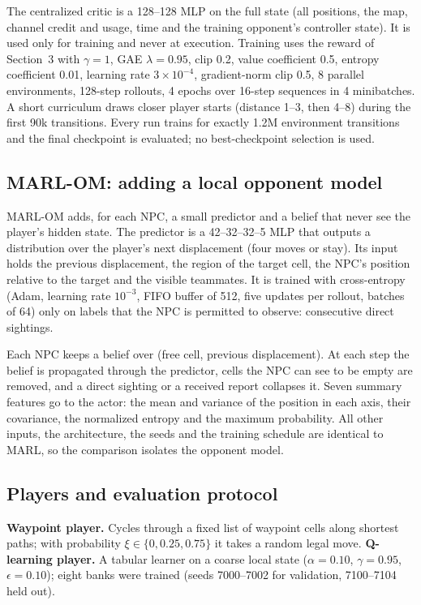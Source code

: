 \documentclass{article}
\begin{document}
The centralized critic is a 128--128 MLP on the full state (all positions, the map, channel credit and usage, time and the training opponent's controller state). It is used only for training and never at execution. Training uses the reward of Section~3 with $\gamma=1$, GAE $\lambda=0.95$, clip 0.2, value coefficient 0.5, entropy coefficient 0.01, learning rate $3\times10^{-4}$, gradient-norm clip 0.5, 8 parallel environments, 128-step rollouts, 4 epochs over 16-step sequences in 4 minibatches. A short curriculum draws closer player starts (distance 1--3, then 4--8) during the first 90k transitions. Every run trains for exactly 1.2M environment transitions and the final checkpoint is evaluated; no best-checkpoint selection is used.

\subsection{MARL-OM: adding a local opponent model}
MARL-OM adds, for each NPC, a small predictor and a belief that never see the player's hidden state. The predictor is a 42--32--32--5 MLP that outputs a distribution over the player's next displacement (four moves or stay). Its input holds the previous displacement, the region of the target cell, the NPC's position relative to the target and the visible teammates. It is trained with cross-entropy (Adam, learning rate $10^{-3}$, FIFO buffer of 512, five updates per rollout, batches of 64) only on labels that the NPC is permitted to observe: consecutive direct sightings.

Each NPC keeps a belief over (free cell, previous displacement). At each step the belief is propagated through the predictor, cells the NPC can see to be empty are removed, and a direct sighting or a received report collapses it. Seven summary features go to the actor: the mean and variance of the position in each axis, their covariance, the normalized entropy and the maximum probability. All other inputs, the architecture, the seeds and the training schedule are identical to MARL, so the comparison isolates the opponent model.

\subsection{Players and evaluation protocol}
\textbf{Waypoint player.} Cycles through a fixed list of waypoint cells along shortest paths; with probability $\xi\in\{0,0.25,0.75\}$ it takes a random legal move. \textbf{Q-learning player.} A tabular learner on a coarse local state ($\alpha=0.10$, $\gamma=0.95$, $\epsilon=0.10$); eight banks were trained (seeds 7000--7002 for validation, 7100--7104 held out).
\end{document}
